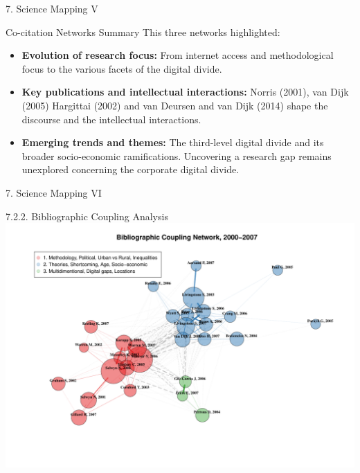 \documentclass[
  ignorenonframetext,
]{beamer}
\begin{document}
\begin{frame}{7. Science Mapping V}
\protect\hypertarget{science-mapping-v}{}
\begin{block}{Co-citation Networks Summary}
\protect\hypertarget{co-citation-networks-summary}{}
This three networks highlighted:

\begin{itemize}
\item
  \textbf{Evolution of research focus:} From internet access and
  methodological focus to the various facets of the digital divide.
\item
  \textbf{Key publications and intellectual interactions:} Norris
  (2001), van Dijk (2005) Hargittai (2002) and van Deursen and van Dijk
  (2014) shape the discourse and the intellectual interactions.
\item
  \textbf{Emerging trends and themes:} The third-level digital divide
  and its broader socio-economic ramifications. Uncovering a research
  gap remains unexplored concerning the corporate digital divide.
\end{itemize}
\end{block}
\end{frame}

\begin{frame}{7. Science Mapping VI}
\protect\hypertarget{science-mapping-vi}{}
\begin{block}{7.2.2. Bibliographic Coupling Analysis}
\protect\hypertarget{bibliographic-coupling-analysis}{}
\includegraphics{Presentation_bibliometric_Urbino_may_23_files/figure-beamer/Bib_coup_P1-1.pdf}
\end{block}
\end{frame}
\end{document}
